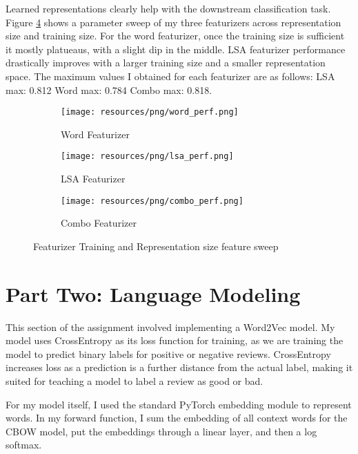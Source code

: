 Learned representations clearly help with the downstream classification task. Figure \ref{fig:fig} shows a parameter sweep of my three featurizers across representation size and training size. For the word featurizer, once the training size is sufficient it mostly platueaus, with a slight dip in the middle.
LSA featurizer performance drastically improves with a larger training size and a smaller representation space. The maximum values I obtained for each featurizer are as follows: LSA max: 0.812 Word max: 0.784 Combo max: 0.818.

\begin{figure}[ht]
    \begin{subfigure}{.5\textwidth}
        \centering
        \texttt{[image: resources/png/word\_perf.png]}
        \caption{Word Featurizer}
        \label{fig:sub-first}
    \end{subfigure}
    \begin{subfigure}{.5\textwidth}
        \centering
        \texttt{[image: resources/png/lsa\_perf.png]}
        \caption{LSA Featurizer}
        \label{fig:sub-second}
    \end{subfigure}
    \begin{subfigure}{.5\textwidth}
        \centering
        \texttt{[image: resources/png/combo\_perf.png]}
        \caption{Combo Featurizer}
        \label{fig:sub-third}
    \end{subfigure}
    \caption{Featurizer Training and Representation size feature sweep}
    \label{fig:fig}
\end{figure}

\chapter*{Part Two: Language Modeling}

This section of the assignment involved implementing a Word2Vec model. My model uses CrossEntropy as its loss function for training, as we are training the model to predict binary labels for positive or negative reviews. CrossEntropy increases loss as a prediction is a further distance from the actual label, making it suited for teaching a model to label a review as good or bad.

For my model itself, I used the standard PyTorch embedding module to represent words. In my forward function, I sum the embedding of all context words for the CBOW model, put the embeddings through a linear layer, and then a log softmax.

